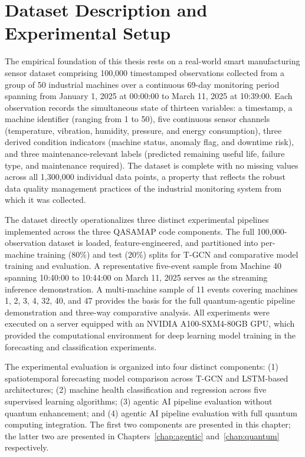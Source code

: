 \section{Dataset Description and Experimental Setup}

The empirical foundation of this thesis rests on a real-world smart manufacturing sensor dataset comprising 100,000 timestamped observations collected from a group of 50 industrial machines over a continuous 69-day monitoring period spanning from January 1, 2025 at 00:00:00 to March 11, 2025 at 10:39:00. Each observation records the simultaneous state of thirteen variables: a timestamp, a machine identifier (ranging from 1 to 50), five continuous sensor channels (temperature, vibration, humidity, pressure, and energy consumption), three derived condition indicators (machine status, anomaly flag, and downtime risk), and three maintenance-relevant labels (predicted remaining useful life, failure type, and maintenance required). The dataset is complete with no missing values across all 1,300,000 individual data points, a property that reflects the robust data quality management practices of the industrial monitoring system from which it was collected.

The dataset directly operationalizes three distinct experimental pipelines implemented across the three QASAMAP code components. The full 100,000-observation dataset is loaded, feature-engineered, and partitioned into per-machine training (80\%) and test (20\%) splits for T-GCN and comparative model training and evaluation. A representative five-event sample from Machine 40 spanning 10:40:00 to 10:44:00 on March 11, 2025 serves as the streaming inference demonstration. A multi-machine sample of 11 events covering machines 1, 2, 3, 4, 32, 40, and 47 provides the basis for the full quantum-agentic pipeline demonstration and three-way comparative analysis. All experiments were executed on a server equipped with an NVIDIA A100-SXM4-80GB GPU, which provided the computational environment for deep learning model training in the forecasting and classification experiments.

The experimental evaluation is organized into four distinct components: (1) spatiotemporal forecasting model comparison across T-GCN and LSTM-based architectures; (2) machine health classification and regression across five supervised learning algorithms; (3) agentic AI pipeline evaluation without quantum enhancement; and (4) agentic AI pipeline evaluation with full quantum computing integration. The first two components are presented in this chapter; the latter two are presented in Chapters~\ref{chap:agentic} and~\ref{chap:quantum} respectively.

